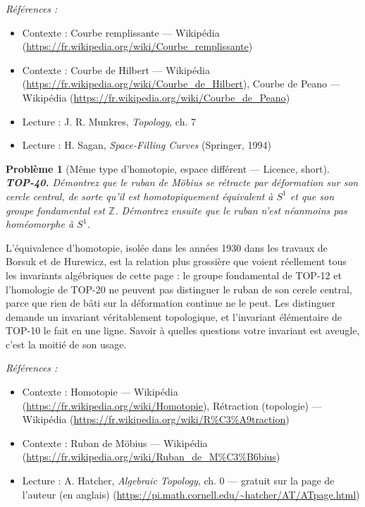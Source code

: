 \documentclass[11pt]{article}
\newtheorem{problem}{Problème}
\newenvironment{refs}{\par\small\noindent\emph{Références :}\begin{itemize}\setlength\itemsep{0pt}}{\end{itemize}\normalsize}
\begin{document}
\begin{refs}
\item Contexte : Courbe remplissante --- Wikipédia (\url{https://fr.wikipedia.org/wiki/Courbe_remplissante})
\item Contexte : Courbe de Hilbert --- Wikipédia (\url{https://fr.wikipedia.org/wiki/Courbe_de_Hilbert}), Courbe de Peano --- Wikipédia (\url{https://fr.wikipedia.org/wiki/Courbe_de_Peano})
\item Lecture : J. R. Munkres, \textit{Topology}, ch. 7
\item Lecture : H. Sagan, \textit{Space-Filling Curves} (Springer, 1994)
\end{refs}

\bigskip

\begin{problem}[{Même type d'homotopie, espace différent --- Licence, short}]
\textbf{TOP-40.} Démontrez que le ruban de Möbius se rétracte par déformation sur
son cercle central, de sorte qu'il est homotopiquement équivalent à $ S^1 $ et que son groupe
fondamental est $ \mathbb{Z} $. Démontrez ensuite que le ruban n'est néanmoins \textit{pas} homéomorphe
à $ S^1 $.
\end{problem}

\noindent L'équivalence d'homotopie, isolée dans les années 1930 dans les travaux de Borsuk et
de Hurewicz, est la relation plus grossière que voient réellement tous les invariants algébriques de cette
page : le groupe fondamental de TOP-12 et l'homologie de TOP-20 ne peuvent pas distinguer le ruban de son
cercle central, parce que rien de bâti sur la déformation continue ne le peut. Les distinguer demande un
invariant véritablement topologique, et l'invariant élémentaire de TOP-10 le fait en une ligne. Savoir à
quelles questions votre invariant est aveugle, c'est la moitié de son usage.

\begin{refs}
\item Contexte : Homotopie --- Wikipédia (\url{https://fr.wikipedia.org/wiki/Homotopie}), Rétraction (topologie) --- Wikipédia (\url{https://fr.wikipedia.org/wiki/R%C3%A9traction})
\item Contexte : Ruban de Möbius --- Wikipédia (\url{https://fr.wikipedia.org/wiki/Ruban_de_M%C3%B6bius})
\item Lecture : A. Hatcher, \textit{Algebraic Topology}, ch. 0 --- gratuit sur la page de l'auteur (en anglais) (\url{https://pi.math.cornell.edu/~hatcher/AT/ATpage.html})
\end{refs}
\end{document}
